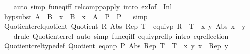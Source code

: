 \begin{isabellebody}
%
\isadelimproof
\ \ %
\endisadelimproof
%
\isatagproof
{}\isamarkupfalse%
\ {\isacharparenleft}{\kern0pt}auto\ simp{\isacharcolon}{\kern0pt}\ fun{\isacharunderscore}{\kern0pt}eq{\isacharunderscore}{\kern0pt}iff\ relcompp{\isacharunderscore}{\kern0pt}apply\ intro{\isacharbang}{\kern0pt}{\isacharcolon}{\kern0pt}\ exI{\isacharbrackleft}{\kern0pt}of\ {\isacharunderscore}{\kern0pt}\ {\isachardoublequoteopen}Inl\ {\isacharunderscore}{\kern0pt}{\isachardoublequoteclose}{\isacharbrackright}{\kern0pt}{\isacharparenright}{\kern0pt}%
\endisatagproof
{\isafoldproof}%
%
\isadelimproof
\isanewline
%
\endisadelimproof
\isanewline
{}\isamarkupfalse%
\ hypsubst{\isacharcolon}{\kern0pt}\ {\isachardoublequoteopen}A\ {\isacharequal}{\kern0pt}\ B\ {\isasymLongrightarrow}\ x\ {\isasymin}\ B\ {\isasymLongrightarrow}\ {\isacharparenleft}{\kern0pt}x\ {\isasymin}\ A\ {\isasymLongrightarrow}\ P{\isacharparenright}{\kern0pt}\ {\isasymLongrightarrow}\ P{\isachardoublequoteclose}%
\isadelimproof
\ %
\endisadelimproof
%
\isatagproof
{}\isamarkupfalse%
\ simp%
\endisatagproof
{\isafoldproof}%
%
\isadelimproof
%
\endisadelimproof
\isanewline
\isanewline
{}\isamarkupfalse%
\ Quotient{\isacharunderscore}{\kern0pt}crel{\isacharunderscore}{\kern0pt}quotient{\isacharcolon}{\kern0pt}\ {\isachardoublequoteopen}Quotient\ R\ Abs\ Rep\ T\ {\isasymLongrightarrow}\ equivp\ R\ {\isasymLongrightarrow}\ T\ {\isasymequiv}\ {\isacharparenleft}{\kern0pt}{\isasymlambda}x\ y{\isachardot}{\kern0pt}\ Abs\ x\ {\isacharequal}{\kern0pt}\ y{\isacharparenright}{\kern0pt}{\isachardoublequoteclose}\isanewline
%
\isadelimproof
\ \ %
\endisadelimproof
%
\isatagproof
{}\isamarkupfalse%
\ {\isacharparenleft}{\kern0pt}drule\ Quotient{\isacharunderscore}{\kern0pt}cr{\isacharunderscore}{\kern0pt}rel{\isacharparenright}{\kern0pt}\ {\isacharparenleft}{\kern0pt}auto\ simp{\isacharcolon}{\kern0pt}\ fun{\isacharunderscore}{\kern0pt}eq{\isacharunderscore}{\kern0pt}iff\ equivp{\isacharunderscore}{\kern0pt}reflp\ intro{\isacharbang}{\kern0pt}{\isacharcolon}{\kern0pt}\ eq{\isacharunderscore}{\kern0pt}reflection{\isacharparenright}{\kern0pt}%
\endisatagproof
{\isafoldproof}%
%
\isadelimproof
\isanewline
%
\endisadelimproof
\isanewline
{}\isamarkupfalse%
\ Quotient{\isacharunderscore}{\kern0pt}crel{\isacharunderscore}{\kern0pt}typedef{\isacharcolon}{\kern0pt}\ {\isachardoublequoteopen}Quotient\ {\isacharparenleft}{\kern0pt}eq{\isacharunderscore}{\kern0pt}onp\ P{\isacharparenright}{\kern0pt}\ Abs\ Rep\ T\ {\isasymLongrightarrow}\ T\ {\isasymequiv}\ {\isacharparenleft}{\kern0pt}{\isasymlambda}x\ y{\isachardot}{\kern0pt}\ x\ {\isacharequal}{\kern0pt}\ Rep\ y{\isacharparenright}{\kern0pt}{\isachardoublequoteclose}\isanewline

\end{isabellebody}

